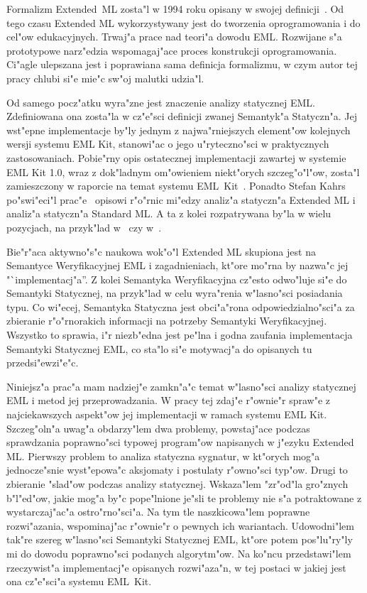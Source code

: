 
Formalizm Extended~ML zosta"l w 1994 roku opisany w swojej definicji~\cite{bib:KST94}.
Od tego czasu Extended ML wykorzystywany jest
do tworzenia oprogramowania i do cel"ow edukacyjnych.
Trwaj"a prace nad teori"a dowodu EML. Rozwijane s"a prototypowe 
narz"edzia wspomagaj"ace proces konstrukcji oprogramowania.
Ci"agle ulepszana jest i poprawiana sama definicja formalizmu,
w czym autor tej pracy chlubi si"e mie"c sw"oj malutki udzia"l.

Od samego pocz"atku wyra"zne jest znaczenie analizy statycznej EML.
Zdefiniowana ona zosta"la w cz"e"sci definicji zwanej Semantyk"a Statyczn"a.
Jej wst"epne implementacje by"ly jednym z najwa"rniejszych element"ow 
kolejnych wersji systemu EML Kit, stanowi"ac o jego u"ryteczno"sci w praktycznych zastosowaniach.
Pobie"rny opis ostatecznej implementacji zawartej w systemie EML Kit 1.0,
wraz z dok"ladnym om"owieniem niekt"orych szczeg"o"l"ow, 
zosta"l zamieszczony w raporcie na temat systemu EML~Kit~\cite{JKS96}.
Ponadto Stefan Kahrs po"swi"eci"l prac"e~\cite{Kah94} opisowi 
r"o"rnic mi"edzy analiz"a statyczn"a Extended ML i analiz"a statyczn"a Standard ML.
A ta z kolei rozpatrywana by"la w wielu pozycjach, na przyk"lad w~\cite{MT91} czy w~\cite{Ler92}.

Bie"r"aca aktywno"s"c naukowa wok"o"l Extended ML skupiona jest na
Semantyce Weryfikacyjnej EML i zagadnieniach, kt"ore mo"rna by nazwa"c jej "`implementacj"a''.
Z kolei Semantyka Weryfikacyjna cz"esto odwo"luje si"e do Semantyki Statycznej,
na przyk"lad w celu wyra"renia w"lasno"sci posiadania typu.
Co wi"ecej, Semantyka Statyczna jest obci"a"rona odpowiedzialno"sci"a
za zbieranie r"o"rnorakich informacji na potrzeby Semantyki Weryfikacyjnej.
Wszystko to sprawia, i"r niezb"edna jest pe"lna i godna zaufania
implementacja Semantyki Statycznej EML, co sta"lo si"e motywacj"a do opisanych tu przedsi"ewzi"e"c. 

Niniejsz"a prac"a mam nadziej"e zamkn"a"c temat w"lasno"sci 
analizy statycznej EML i metod jej przeprowadzania.
W pracy tej zdaj"e r"ownie"r spraw"e z najciekawszych aspekt"ow 
jej implementacji w ramach systemu EML Kit.
Szczeg"oln"a uwag"a obdarzy"lem dwa problemy, powstaj"ace podczas sprawdzania
poprawno"sci typowej program"ow napisanych w j"ezyku Extended ML.
Pierwszy problem to analiza statyczna sygnatur, 
w kt"orych mog"a jednocze"snie wyst"epowa"c aksjomaty i postulaty r"owno"sci typ"ow.
Drugi to zbieranie "slad"ow podczas analizy statycznej.
Wskaza"lem "zr"od"la gro"znych b"l"ed"ow, jakie mog"a by"c pope"lnione
je"sli te problemy nie s"a potraktowane z wystarczaj"ac"a ostro"rno"sci"a.
Na tym tle naszkicowa"lem poprawne rozwi"azania, 
wspominaj"ac r"ownie"r o pewnych ich wariantach.
Udowodni"lem tak"re szereg w"lasno"sci Semantyki Statycznej EML,
kt"ore potem pos"lu"ry"ly mi do dowodu poprawno"sci podanych algorytm"ow.
Na ko"ncu przedstawi"lem rzeczywist"a implementacj"e opisanych rozwi"aza"n,
w tej postaci w jakiej jest ona cz"e"sci"a systemu EML~Kit.

